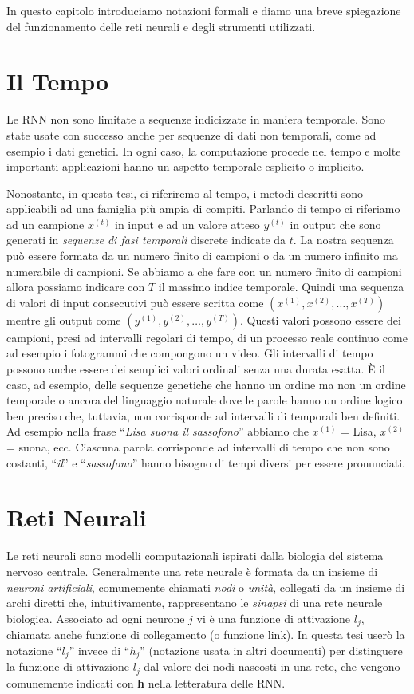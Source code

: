 In questo capitolo introduciamo notazioni formali e diamo una breve spiegazione
del funzionamento delle reti neurali e degli strumenti utilizzati.

\section{Il Tempo}

Le RNN non sono limitate a sequenze indicizzate in maniera temporale.
Sono state usate con successo anche per sequenze di dati non temporali,
come ad esempio i dati genetici. In ogni caso, la computazione procede nel tempo
e molte importanti applicazioni hanno un aspetto temporale esplicito o implicito.

Nonostante, in questa tesi, ci riferiremo al tempo, i metodi descritti sono
applicabili ad una famiglia pi\`u ampia di compiti. Parlando di tempo ci riferiamo
ad un campione $x^{(t)}$ in input e ad un valore atteso $y^{(t)}$ in output che
sono generati in \emph{sequenze di fasi temporali} discrete indicate da $t$.
La nostra sequenza pu\`o essere formata da un numero finito di campioni o da un
numero infinito ma numerabile di campioni. Se abbiamo a che fare con un numero
finito di campioni allora possiamo indicare con $T$ il massimo indice temporale.
Quindi una sequenza di valori di input consecutivi pu\`o essere scritta come
$(x^{(1)}, x^{(2)}, \dots, x^{(T)})$ mentre gli output come
$(y^{(1)}, y^{(2)}, \dots, y^{(T)})$. Questi valori possono essere dei campioni,
presi ad intervalli regolari di tempo, di un processo reale continuo come ad
esempio i fotogrammi che compongono un video. Gli intervalli di tempo possono
anche essere dei semplici valori ordinali senza una durata esatta. \`E il caso,
ad esempio, delle sequenze genetiche che hanno un ordine ma non un ordine
temporale o ancora del linguaggio naturale dove le parole hanno un ordine logico
ben preciso che, tuttavia, non corrisponde ad intervalli di temporali ben definiti.
Ad esempio nella frase ``\emph{Lisa suona il sassofono}'' abbiamo
che $x^{(1)}$ = Lisa, $x^{(2)}$ = suona, ecc. Ciascuna parola corrisponde ad
intervalli di tempo che non sono costanti, ``\emph{il}'' e ``\emph{sassofono}''
hanno bisogno di tempi diversi per essere pronunciati.

\section{Reti Neurali}

Le reti neurali sono modelli computazionali ispirati dalla biologia del sistema
nervoso centrale. Generalmente una rete neurale \`e formata da un insieme di
\emph{neuroni artificiali}, comunemente chiamati \emph{nodi} o \emph{unit\`a},
collegati da un insieme di archi diretti che, intuitivamente, rappresentano le
\emph{sinapsi} di una rete neurale biologica. Associato ad ogni neurone $j$ vi
\`e una funzione di attivazione $l_j$, chiamata anche funzione di collegamento
(o funzione link). In questa tesi user\`o la notazione ``$l_j$'' invece
di ``$h_j$'' (notazione usata in altri documenti) per distinguere la funzione di
attivazione $l_j$ dal valore dei nodi nascosti in una rete, che vengono
comunemente indicati con \textbf{h} nella letteratura delle RNN.

